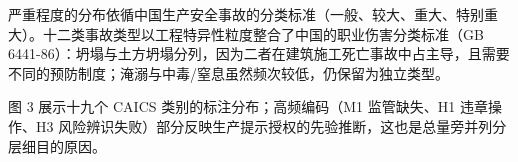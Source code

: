 \documentclass[11pt]{article}
\begin{document}
{\cjkfont 严\allowbreak 重\allowbreak 程\allowbreak 度\allowbreak 的\allowbreak 分\allowbreak 布\allowbreak 依\allowbreak 循\allowbreak 中\allowbreak 国\allowbreak 生\allowbreak 产\allowbreak 安\allowbreak 全\allowbreak 事\allowbreak 故\allowbreak 的\allowbreak 分\allowbreak 类\allowbreak 标\allowbreak 准\allowbreak （\allowbreak 一\allowbreak 般\allowbreak 、\allowbreak 较\allowbreak 大\allowbreak 、\allowbreak 重\allowbreak 大\allowbreak 、\allowbreak 特\allowbreak 别\allowbreak 重\allowbreak 大\allowbreak ）\allowbreak 。\allowbreak 十\allowbreak 二\allowbreak 类\allowbreak 事\allowbreak 故\allowbreak 类\allowbreak 型\allowbreak 以\allowbreak 工\allowbreak 程\allowbreak 特\allowbreak 异\allowbreak 性\allowbreak 粒\allowbreak 度\allowbreak 整\allowbreak 合\allowbreak 了\allowbreak 中\allowbreak 国\allowbreak 的\allowbreak 职\allowbreak 业\allowbreak 伤\allowbreak 害\allowbreak 分\allowbreak 类\allowbreak 标\allowbreak 准\allowbreak （}GB 6441-86{\cjkfont ）\allowbreak ：\allowbreak 坍\allowbreak 塌\allowbreak 与\allowbreak 土\allowbreak 方\allowbreak 坍\allowbreak 塌\allowbreak 分\allowbreak 列\allowbreak ，\allowbreak 因\allowbreak 为\allowbreak 二\allowbreak 者\allowbreak 在\allowbreak 建\allowbreak 筑\allowbreak 施\allowbreak 工\allowbreak 死\allowbreak 亡\allowbreak 事\allowbreak 故\allowbreak 中\allowbreak 占\allowbreak 主\allowbreak 导\allowbreak ，\allowbreak 且\allowbreak 需\allowbreak 要\allowbreak 不\allowbreak 同\allowbreak 的\allowbreak 预\allowbreak 防\allowbreak 制\allowbreak 度\allowbreak ；\allowbreak 淹\allowbreak 溺\allowbreak 与\allowbreak 中\allowbreak 毒}/{\cjkfont 窒\allowbreak 息\allowbreak 虽\allowbreak 然\allowbreak 频\allowbreak 次\allowbreak 较\allowbreak 低\allowbreak ，\allowbreak 仍\allowbreak 保\allowbreak 留\allowbreak 为\allowbreak 独\allowbreak 立\allowbreak 类\allowbreak 型\allowbreak 。}

{\cjkfont 图} 3 {\cjkfont 展\allowbreak 示\allowbreak 十\allowbreak 九\allowbreak 个} CAICS {\cjkfont 类\allowbreak 别\allowbreak 的\allowbreak 标\allowbreak 注\allowbreak 分\allowbreak 布\allowbreak ；\allowbreak 高\allowbreak 频\allowbreak 编\allowbreak 码\allowbreak （}M1 {\cjkfont 监\allowbreak 管\allowbreak 缺\allowbreak 失\allowbreak 、}H1 {\cjkfont 违\allowbreak 章\allowbreak 操\allowbreak 作\allowbreak 、}H3 {\cjkfont 风\allowbreak 险\allowbreak 辨\allowbreak 识\allowbreak 失\allowbreak 败\allowbreak ）\allowbreak 部\allowbreak 分\allowbreak 反\allowbreak 映\allowbreak 生\allowbreak 产\allowbreak 提\allowbreak 示\allowbreak 授\allowbreak 权\allowbreak 的\allowbreak 先\allowbreak 验\allowbreak 推\allowbreak 断\allowbreak ，\allowbreak 这\allowbreak 也\allowbreak 是\allowbreak 总\allowbreak 量\allowbreak 旁\allowbreak 并\allowbreak 列\allowbreak 分\allowbreak 层\allowbreak 细\allowbreak 目\allowbreak 的\allowbreak 原\allowbreak 因\allowbreak 。}
\end{document}
